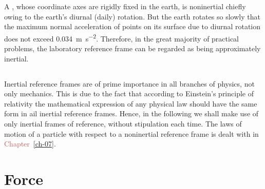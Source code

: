 A , whose coordinate axes are rigidly fixed in the earth, is noninertial chiefly owing to the earth's diurnal (daily) rotation. But the earth rotates so slowly that the maximum normal acceleration  of points on its sur­face due to diurnal rotation does not exceed \SI{0.034}{\meter\per\second\squared}. There­fore, in the great majority of practical problems, the laboratory reference frame can be regarded as being approximately iner­tial.

\subsection{}\label{2.1.4} Inertial reference frames are of prime importance in all branches of physics, not only mechanics. This is due to the fact that according to Einstein's principle of relativity  the mathematical expression of any physical law should have the same form in ail inertial reference frames. Hence, in the following we shall make use of only inertial frames of reference, without stipulation each time. The laws of motion of a particle with respect to a noninertial reference frame is dealt with in \textcolor{IndianRed}{Chapter~\ref{ch-07}}.

\section{Force}
\label{sec-2.2}


